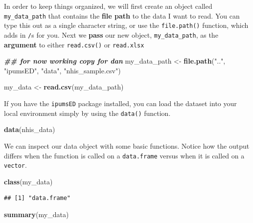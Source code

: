 \documentclass[
]{book}
\newenvironment{Shaded}{\begin{snugshade}}{\end{snugshade}}
\newcommand{\DocumentationTok}[1]{\textcolor[rgb]{0.56,0.35,0.01}{\textbf{\textit{#1}}}}
\newcommand{\FunctionTok}[1]{\textcolor[rgb]{0.13,0.29,0.53}{\textbf{#1}}}
\newcommand{\NormalTok}[1]{#1}
\newcommand{\OtherTok}[1]{\textcolor[rgb]{0.56,0.35,0.01}{#1}}
\newcommand{\StringTok}[1]{\textcolor[rgb]{0.31,0.60,0.02}{#1}}
\begin{document}
In order to keep things organized, we will first create an object called \texttt{my\_data\_path} that contains the \textbf{file path} to the data I want to read. You can type this out as a single character string, or use the \texttt{file.path()} function, which adds in \texttt{/}s for you. Next we \textbf{pass} our new object, \texttt{my\_data\_path}, as the \textbf{argument} to either \texttt{read.csv()} or \texttt{read.xlsx}

\begin{Shaded}
\begin{Highlighting}[]
\DocumentationTok{\#\# for now working copy for dan}
\NormalTok{my\_data\_path }\OtherTok{\textless{}{-}} \FunctionTok{file.path}\NormalTok{(}\StringTok{".."}\NormalTok{, }\StringTok{"ipumsED"}\NormalTok{, }\StringTok{"data"}\NormalTok{, }\StringTok{"nhis\_sample.csv"}\NormalTok{)}



\NormalTok{my\_data }\OtherTok{\textless{}{-}} \FunctionTok{read.csv}\NormalTok{(my\_data\_path)}
\end{Highlighting}
\end{Shaded}

If you have the \texttt{ipumsED} package installed, you can load the dataset into your local environment simply by using the \texttt{data()} function.

\begin{Shaded}
\begin{Highlighting}[]
\FunctionTok{data}\NormalTok{(nhis\_data)}
\end{Highlighting}
\end{Shaded}

We can inspect our data object with some basic functions. Notice how the output differs when the function is called on a \texttt{data.frame} versus when it is called on a \texttt{vector}.

\begin{Shaded}
\begin{Highlighting}[]
\FunctionTok{class}\NormalTok{(my\_data)}
\end{Highlighting}
\end{Shaded}

\begin{verbatim}
## [1] "data.frame"
\end{verbatim}

\begin{Shaded}
\begin{Highlighting}[]
\FunctionTok{summary}\NormalTok{(my\_data)}
\end{Highlighting}
\end{Shaded}
\end{document}
